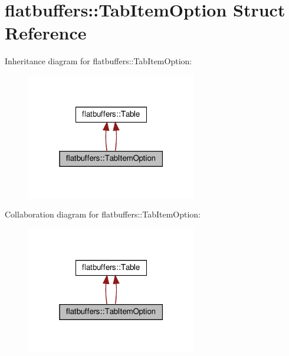 \hypertarget{structflatbuffers_1_1TabItemOption}{}\section{flatbuffers\+:\+:Tab\+Item\+Option Struct Reference}
\label{structflatbuffers_1_1TabItemOption}


Inheritance diagram for flatbuffers\+:\+:Tab\+Item\+Option\+:
\nopagebreak
\begin{figure}[H]
\begin{center}
\leavevmode
\includegraphics[width=211pt]{structflatbuffers_1_1TabItemOption__inherit__graph}
\end{center}
\end{figure}


Collaboration diagram for flatbuffers\+:\+:Tab\+Item\+Option\+:
\nopagebreak
\begin{figure}[H]
\begin{center}
\leavevmode
\includegraphics[width=211pt]{structflatbuffers_1_1TabItemOption__coll__graph}
\end{center}
\end{figure}
